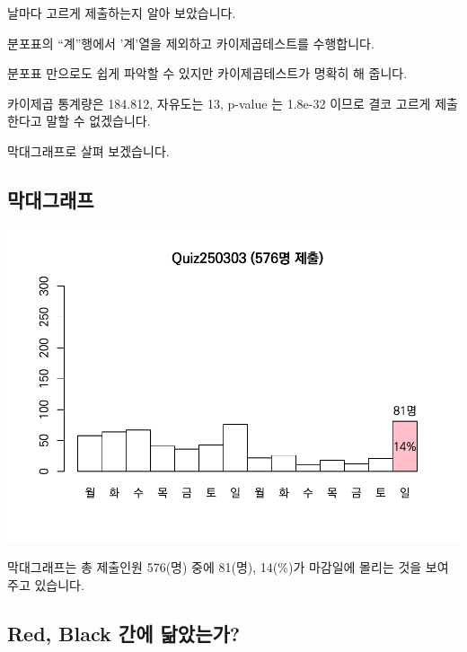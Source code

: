 \documentclass[
]{book}
\begin{document}
날마다 고르게 제출하는지 알아 보았습니다.

분포표의 ``계''행에서 '계'열을 제외하고 카이제곱테스트를 수행합니다.

분포표 만으로도 쉽게 파악할 수 있지만 카이제곱테스트가 명확히 해 줍니다.

카이제곱 통계량은 184.812, 자유도는 13, p-value 는 1.8e-32 이므로 결코 고르게 제출한다고 말할 수 없겠습니다.

막대그래프로 살펴 보겠습니다.

\subsection{막대그래프}\label{uxb9c9uxb300uxadf8uxb798uxd504-1}

\includegraphics{_main_files/figure-latex/unnamed-chunk-30-1.pdf}

막대그래프는 총 제출인원 576(명) 중에 81(명), 14(\%)가 마감일에 몰리는 것을 보여주고 있습니다.

\subsection{Red, Black 간에 닮았는가?}\label{red-black-uxac04uxc5d0-uxb2eeuxc558uxb294uxac00}
\end{document}
